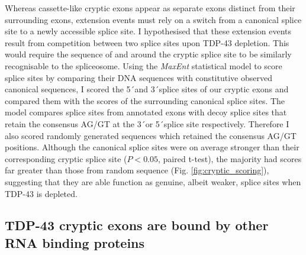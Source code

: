 Whereas cassette-like cryptic exons appear as separate exons distinct from their surrounding exons, extension events must rely on a switch from a canonical splice site to a newly accessible splice site. I hypothesised that these extension events result from competition between two splice sites upon TDP-43 depletion. This would require the sequence of and around the cryptic splice site to be similarly recognisable to the spliceosome. Using the \emph{MaxEnt} statistical model to score splice sites by comparing their DNA sequences with constitutive observed canonical sequences, I scored the 5\'\ and 3\'\ splice sites of our cryptic exons and compared them with the scores of the surrounding canonical splice sites. The model compares splice sites from annotated exons with decoy splice sites that retain the consensus AG/GT at the 3\'\ or 5\'\ splice site respectively. Therefore I also scored randomly generated sequences which retained the consensus AG/GT positions.  Although the canonical splice sites were on average stronger than their corresponding cryptic splice site ($P < 0.05$, paired t-test), the majority had scores far greater than those from random sequence (Fig. \ref{fig:cryptic_scoring}), suggesting that they are able function as genuine, albeit weaker, splice sites when TDP-43 is depleted.



\subsection{TDP-43 cryptic exons are bound by other RNA binding proteins}

